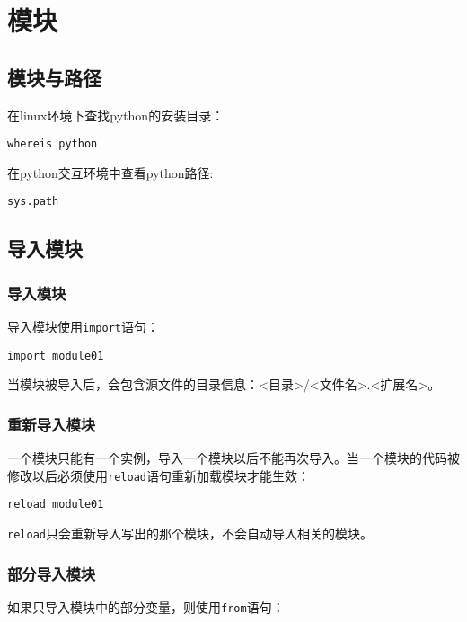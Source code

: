 
\chapter{模块}

\section{模块与路径}

在linux环境下查找python的安装目录：

\begin{lstlisting}
whereis python
\end{lstlisting}

在python交互环境中查看python路径:

\begin{lstlisting}
sys.path
\end{lstlisting}

\section{导入模块}

\subsection{导入模块}

导入模块使用\verb|import|语句：

\begin{lstlisting}
import module01
\end{lstlisting}

当模块被导入后，会包含源文件的目录信息：<目录>/<文件名>.<扩展名>。

\subsection{重新导入模块}

一个模块只能有一个实例，导入一个模块以后不能再次导入。当一个模块的代码被修改以后必须使用\verb|reload|语句重新加载模块才能生效：

\begin{lstlisting}
reload module01
\end{lstlisting}

\verb|reload|只会重新导入写出的那个模块，不会自动导入相关的模块。

\subsection{部分导入模块}
如果只导入模块中的部分变量，则使用\verb|from|语句：

